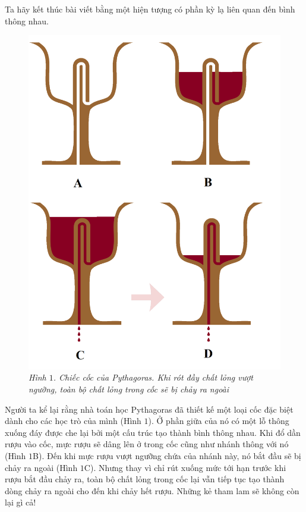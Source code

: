 \begin{multicols}{2}
	Ta hãy kết thúc bài viết bằng một hiện tượng có phần kỳ lạ liên quan đến bình thông nhau. 
	\begin{figure}[H]
		\vspace*{-5pt}
		\centering
		\captionsetup{labelformat= empty, justification=centering}
		\includegraphics[width= 1\linewidth]{1}
		\caption{\small\textit{\color{quantoan}Hình $1$. Chiếc cốc của Pythagoras. Khi rót đầy chất lỏng vượt ngưỡng, toàn bộ chất lỏng trong cốc sẽ bị chảy ra ngoài}}
		\vspace*{-10pt}
	\end{figure}
	Người ta kể lại rằng nhà toán học Pythagoras đã thiết kế một loại cốc đặc biệt dành cho các học trò của mình (Hình $1$). Ở phần giữa của nó có một lỗ thông xuống đáy được che lại bởi một cấu trúc tạo thành bình thông nhau. Khi đổ dần rượu vào cốc, mực rượu sẽ dâng lên ở trong cốc cũng như nhánh thông với nó (Hình $1$B). Đến khi mực rượu vượt ngưỡng chứa của nhánh này, nó bắt đầu sẽ bị chảy ra ngoài (Hình $1$C). Nhưng thay vì chỉ rút xuống mức tới hạn trước khi rượu bắt đầu chảy ra, toàn bộ chất lỏng trong cốc lại vẫn tiếp tục tạo thành dòng chảy ra ngoài cho đến khi chảy hết rượu. Những kẻ tham lam sẽ không còn lại gì cả!

\end{multicols}
